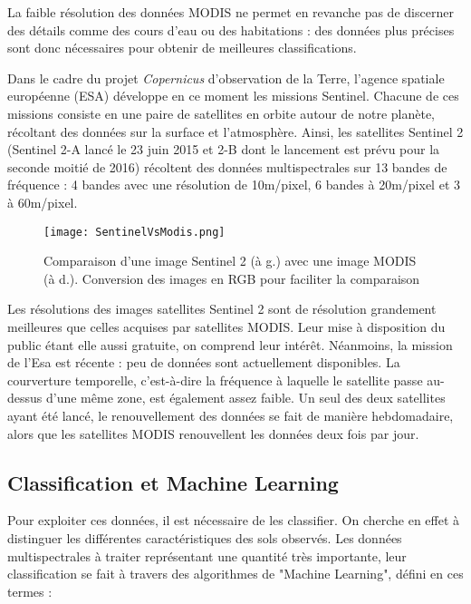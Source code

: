 La faible résolution des données MODIS ne permet en revanche pas de discerner des détails comme des cours d'eau ou des habitations : des données plus précises sont donc nécessaires pour obtenir de meilleures classifications. 

Dans le cadre du projet \textit{Copernicus} d'observation de la Terre, l'agence spatiale européenne (ESA) développe en ce moment les missions Sentinel. Chacune de ces missions consiste en une paire de satellites en orbite autour de notre planète, récoltant des données sur la surface et l'atmosphère. Ainsi, les satellites Sentinel 2 (Sentinel 2-A lancé le 23 juin 2015 et 2-B dont le lancement est prévu pour la seconde moitié de 2016)\cite{sent2} récoltent des données multispectrales sur 13 bandes de fréquence : 4 bandes avec une résolution de 10m/pixel, 6 bandes à 20m/pixel et 3 à 60m/pixel.

\begin{figure}[H]
  \centering
    \texttt{[image: SentinelVsModis.png]}
  \caption{Comparaison d'une image Sentinel 2 (à g.) avec une image MODIS (à d.). Conversion des images en RGB pour faciliter la comparaison}
  \label{fig:SentinelVsModis}
\end{figure}

Les résolutions des images satellites Sentinel 2 sont de résolution grandement meilleures que celles acquises par satellites MODIS. Leur mise à disposition du public étant elle aussi gratuite, on comprend leur intérêt. 
Néanmoins, la mission de l'Esa est récente : peu de données sont actuellement disponibles. La courverture temporelle, c'est-à-dire la fréquence à laquelle le satellite passe au-dessus d'une même zone, est également assez faible. Un seul des deux satellites ayant été lancé, le renouvellement des données se fait de manière hebdomadaire, alors que les satellites MODIS renouvellent les données deux fois par jour. 

\subsection{Classification et Machine Learning}

Pour exploiter ces données, il est nécessaire de les classifier. On cherche en effet à distinguer les différentes caractéristiques des sols observés. Les données multispectrales à traiter représentant une quantité très importante, leur classification se fait à travers des algorithmes de "Machine Learning", défini en ces termes : 

